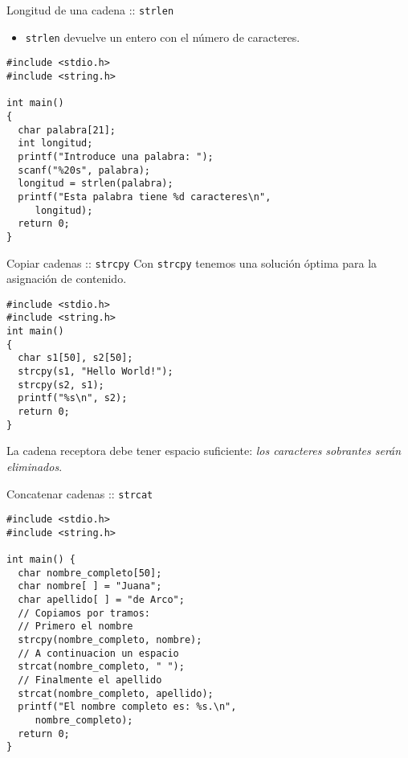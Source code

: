 \documentclass[xcolor={usenames,svgnames,dvipsnames}, aspectratio=169]{beamer}
\begin{document}
\begin{frame}[label={sec:org1aa6238},fragile]{Longitud de una cadena :: \texttt{strlen}}
 \begin{itemize}
\item \texttt{strlen} devuelve un entero con el número de caracteres.
\end{itemize}
\lstset{language=C,label= ,caption= ,captionpos=b,numbers=none}
\begin{lstlisting}
#include <stdio.h>
#include <string.h>

int main()
{
  char palabra[21];
  int longitud;
  printf("Introduce una palabra: ");
  scanf("%20s", palabra);
  longitud = strlen(palabra);
  printf("Esta palabra tiene %d caracteres\n",
	 longitud);
  return 0;
}
\end{lstlisting}
\end{frame}


\begin{frame}[label={sec:org15318a2},fragile]{Copiar cadenas :: \texttt{strcpy}}
 Con \texttt{strcpy} tenemos una solución óptima para la \alert{asignación de contenido}.

\lstset{language=C,label= ,caption= ,captionpos=b,numbers=none}
\begin{lstlisting}
#include <stdio.h>
#include <string.h>
int main()
{
  char s1[50], s2[50];
  strcpy(s1, "Hello World!");
  strcpy(s2, s1);
  printf("%s\n", s2);
  return 0;
}
\end{lstlisting}

\begin{block}{}
La cadena receptora debe tener espacio suficiente: \emph{los caracteres sobrantes serán eliminados}.
\end{block}
\end{frame}

\begin{frame}[label={sec:org214bc49},fragile]{Concatenar cadenas :: \texttt{strcat}}
 \lstset{language=C,label= ,caption= ,captionpos=b,numbers=none}
\begin{lstlisting}
#include <stdio.h>
#include <string.h>

int main() {
  char nombre_completo[50];
  char nombre[ ] = "Juana";
  char apellido[ ] = "de Arco";
  // Copiamos por tramos:
  // Primero el nombre
  strcpy(nombre_completo, nombre);
  // A continuacion un espacio
  strcat(nombre_completo, " ");
  // Finalmente el apellido
  strcat(nombre_completo, apellido);
  printf("El nombre completo es: %s.\n",
	 nombre_completo);
  return 0;
}
\end{lstlisting}
\end{frame}
\end{document}
